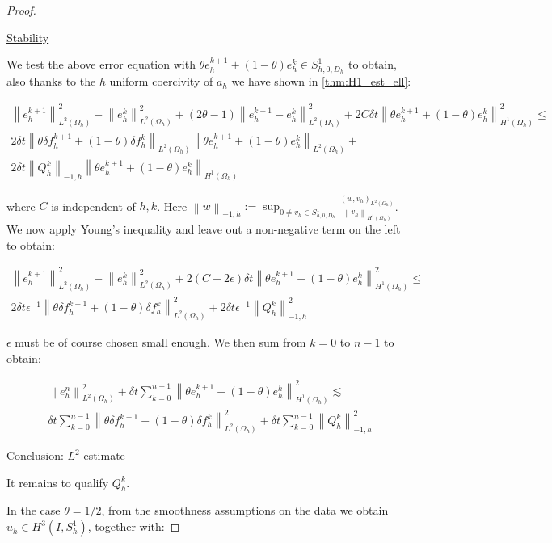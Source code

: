 \documentclass[english,a4paper,9pt,oneside]{scrbook}	%
\theoremstyle{break}
\newenvironment{mproof}[1][\proofname]{%
  \begin{proof}[#1]$ $\par\nobreak\ignorespaces
}{%
  \end{proof}
}
\renewcommand*{\proofname}{Proof}
\theoremstyle{remark}
\newcommand{\ds}{\displaystyle}
\newcommand{\norm}[1]{\left\lVert#1\right\rVert}
\begin{document}
\begin{appendices}
\begin{mproof}
\underline{Stability}

We test the above error equation with $\theta e_h^{k+1}+(1-\theta)e_h^k \in S^1_{h,0,D_h}$ to obtain, also thanks to the $h$ uniform coercivity of $a_h$ we have shown in \cref{thm:H1_est_ell}:

\begin{align*}
\norm{e_{h}^{k+1}}_{L^2(\Omega_h)}^2-\norm{e_h^k}^2_{L^2(\Omega_h)}+ (2\theta -1)\norm{e_h^{k+1}-e_h^{k}}_{L^2(\Omega_h)}^2 + 2C\delta t \norm{\theta e_h^{k+1}+(1-\theta)e^k_h}_{H^1(\Omega_h)}^2 \leq \\ 2\delta t \norm{\theta \delta f_h^{k+1}+(1-\theta)\delta f_h^k}_{L^2(\Omega_h)}\norm{\theta e_h^{k+1}+(1-\theta)e_h^k}_{L^2(\Omega_h)} +\\ 2\delta t \norm{ Q_h^k}_{-1,h}\norm{\theta e_h^{k+1}+(1-\theta)e_h^k}_{H^1(\Omega_h)}
\end{align*}

where $C$ is independent of $h,k$. Here $\norm{w}_{-1,h}:=\ds \sup_{0 \neq v_h \in S^1_{h,0,D_h} }\frac{(w,v_h)_{L^2(\Omega_h)}}{\norm{v_h}_{H^1(\Omega_h)}}$. We now apply Young's inequality and leave out a non-negative term on the left to obtain:

\begin{align*}
\norm{e_{h}^{k+1}}_{L^2(\Omega_h)}^2-\norm{e_h^k}^2_{L^2(\Omega_h)}+ 2(C - 2\epsilon) \delta t \norm{\theta e_h^{k+1}+(1-\theta)e^k_h}_{H^1(\Omega_h)}^2 \leq \\
2\delta t\epsilon^{-1} \norm{\theta \delta f_h^{k+1}+(1-\theta)\delta f_h^k}_{L^2(\Omega_h)}^2 + 2\delta t \epsilon^{-1}\norm{ Q_h^k}_{-1,h}^2
\end{align*}

$\epsilon$ must be of course chosen small enough. We then sum from $k=0$ to $n-1$ to obtain:

\begin{align*}
\norm{e_{h}^{n}}_{L^2(\Omega_h)}^2 + \delta t \sum_{k=0}^{n-1}\norm{\theta e_h^{k+1}+(1-\theta)e^k_h}_{H^1(\Omega_h)}^2 \lesssim \\
\delta t\sum_{k=0}^{n-1} \norm{\theta \delta f_h^{k+1}+(1-\theta)\delta f_h^k}_{L^2(\Omega_h)}^2 + \delta t \sum_{k=0}^{n-1}\norm{ Q_h^k}_{-1,h}^2
\end{align*}

\underline{Conclusion: $L^2$ estimate}

It remains to qualify $ Q_h^k$.

In the case $\theta = 1/2$, from the smoothness assumptions on the data we obtain $u_h \in H^3(I,S^1_h)$, together with:


\end{mproof}
\end{appendices}
\end{document}
